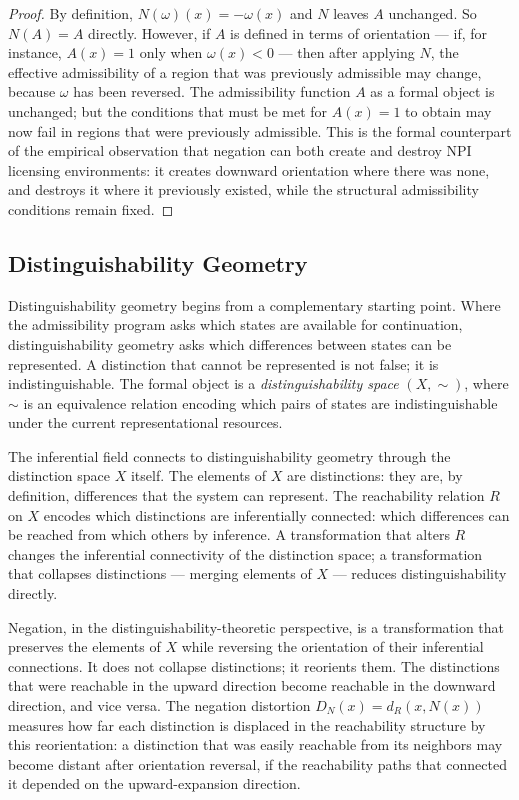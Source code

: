 \documentclass[12pt]{article}
\theoremstyle{remark}
\begin{document}
\begin{proof}
By definition, $N(\omega)(x) = -\omega(x)$ and $N$ leaves $A$
unchanged. So $N(A) = A$ directly. However, if $A$ is defined in terms
of orientation --- if, for instance, $A(x) = 1$ only when $\omega(x)
< 0$ --- then after applying $N$, the effective admissibility of a
region that was previously admissible may change, because $\omega$ has
been reversed. The admissibility function $A$ as a formal object is
unchanged; but the conditions that must be met for $A(x) = 1$ to obtain
may now fail in regions that were previously admissible. This is the
formal counterpart of the empirical observation that negation can both
create and destroy NPI licensing environments: it creates downward
orientation where there was none, and destroys it where it previously
existed, while the structural admissibility conditions remain fixed.
\end{proof}

\subsection{Distinguishability Geometry}

Distinguishability geometry begins from a complementary starting point.
Where the admissibility program asks which states are available for
continuation, distinguishability geometry asks which differences between
states can be represented. A distinction that cannot be represented is
not false; it is indistinguishable. The formal object is a
\emph{distinguishability space} $(X, \sim)$, where $\sim$ is an
equivalence relation encoding which pairs of states are
indistinguishable under the current representational resources.

The inferential field connects to distinguishability geometry through the
distinction space $X$ itself. The elements of $X$ are distinctions: they
are, by definition, differences that the system can represent. The
reachability relation $R$ on $X$ encodes which distinctions are
inferentially connected: which differences can be reached from which
others by inference. A transformation that alters $R$ changes the
inferential connectivity of the distinction space; a transformation that
collapses distinctions --- merging elements of $X$ --- reduces
distinguishability directly.

Negation, in the distinguishability-theoretic perspective, is a
transformation that preserves the elements of $X$ while reversing the
orientation of their inferential connections. It does not collapse
distinctions; it reorients them. The distinctions that were reachable
in the upward direction become reachable in the downward direction, and
vice versa. The negation distortion $D_N(x) = d_R(x, N(x))$ measures
how far each distinction is displaced in the reachability structure by
this reorientation: a distinction that was easily reachable from its
neighbors may become distant after orientation reversal, if the
reachability paths that connected it depended on the upward-expansion
direction.
\end{document}

